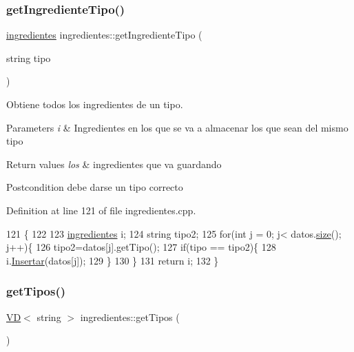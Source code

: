 \subsubsection{\texorpdfstring{get\+Ingrediente\+Tipo()}{getIngredienteTipo()}}
{\footnotesize\ttfamily \hyperlink{classingredientes}{ingredientes} ingredientes\+::get\+Ingrediente\+Tipo (\begin{DoxyParamCaption}\item[{string}]{tipo }\end{DoxyParamCaption})}



Obtiene todos los ingredientes de un tipo. 


\begin{DoxyParams}{Parameters}
{\em i} & Ingredientes en los que se va a almacenar los que sean del mismo tipo \\
\hline
\end{DoxyParams}

\begin{DoxyRetVals}{Return values}
{\em los} & ingredientes que va guardando \\
\hline
\end{DoxyRetVals}
\begin{DoxyPostcond}{Postcondition}
debe darse un tipo correcto 
\end{DoxyPostcond}


Definition at line 121 of file ingredientes.\+cpp.


\begin{DoxyCode}
121                                                          \{
122 
123     \hyperlink{classingredientes}{ingredientes} i;
124     \textcolor{keywordtype}{string} tipo2;
125     \textcolor{keywordflow}{for}(\textcolor{keywordtype}{int} j = 0; j< datos.\hyperlink{classVD_a411ad026db1c8e0617d9031f1f1017a5}{size}(); j++)\{
126         tipo2=datos[j].getTipo();
127         \textcolor{keywordflow}{if}(tipo == tipo2)\{
128             i.\hyperlink{classingredientes_abbf5ea48179d79c13e5abd6c09393ada}{Insertar}(datos[j]);
129         \}
130     \}
131     \textcolor{keywordflow}{return} i;
132 \}
\end{DoxyCode}
\mbox{\label{classingredientes_a0404324a62539f06a97498169b879005}} 
\subsubsection{\texorpdfstring{get\+Tipos()}{getTipos()}}
{\footnotesize\ttfamily \hyperlink{classVD}{VD}$<$ string $>$ ingredientes\+::get\+Tipos (\begin{DoxyParamCaption}{ }\end{DoxyParamCaption})}



